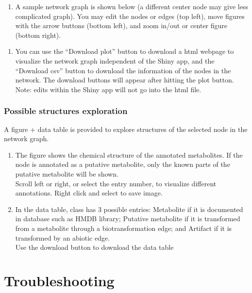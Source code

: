 \documentclass[]{article}
\providecommand{\tightlist}{%
  \setlength{\itemsep}{0pt}\setlength{\parskip}{0pt}}
\begin{document}
\begin{enumerate}
\def\labelenumi{\arabic{enumi}.}
\setcounter{enumi}{4}
\tightlist
\item
  A sample network graph is shown below (a different center node may give less complicated graph). You may edit the nodes or edges (top left), move figures with the arrow buttons (bottom left), and zoom in/out or center figure (bottom right).
\end{enumerate}

\begin{enumerate}
\def\labelenumi{\arabic{enumi}.}
\setcounter{enumi}{5}
\tightlist
\item
  You can use the ``Download plot'' button to download a html webpage to visualize the network graph independent of the Shiny app, and the ``Download csv'' button to download the information of the nodes in the network. The download buttons will appear after hitting the plot button. Note: edits within the Shiny app will not go into the html file.
\end{enumerate}

\hypertarget{possible-structures-exploration}{%
\subsubsection{Possible structures exploration}\label{possible-structures-exploration}}

A figure + data table is provided to explore structures of the selected node in the network graph.

\begin{enumerate}
\def\labelenumi{\arabic{enumi}.}
\item
  The figure shows the chemical structure of the annotated metabolites. If the node is annotated as a putative metabolite, only the known parts of the putative metabolite will be shown.\\
  Scroll left or right, or select the entry number, to visualize different annotations. Right click and select to save image.
\item
  In the data table, class has 3 possible entries: Metabolite if it is documented in database such as HMDB library; Putative metabolite if it is transformed from a metabolite through a biotransformation edge; and Artifact if it is transformed by an abiotic edge.\\
  Use the download button to download the data table
\end{enumerate}

\hypertarget{troubleshooting}{%
\section{Troubleshooting}\label{troubleshooting}}
\end{document}
